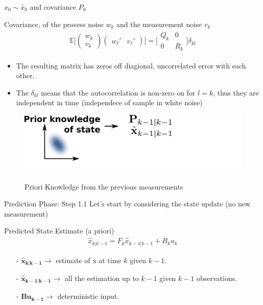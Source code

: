 \documentclass[aspectratio=169,hyperref={pdfpagelabels=false}]{beamer}
\begin{document}
\begin{frame}{}
  $x_0 \sim \tilde{x_0}$ and covariance $P_0$
  \begin{block}{Covariance, of the process noise $w_k$ and the measurement noise $v_k$}
    \begin{align*}
      \mathbb{E}\Biggl [
        \begin{pmatrix}
        w_k \\
        v_k
        \end{pmatrix}
        \begin{pmatrix}
          w_{\ell}' & v_{\ell}'
          \end{pmatrix}
        \Biggr ] = \Biggl [ \begin{matrix}
          Q_k & 0\\
          0 & R_k 
          \end{matrix} \Biggr ] \delta_{kl}
    \end{align*}
  \end{block}
\begin{itemize}
  \item The resulting matrix has zeros off diagional, uncorrelated error with each other.
  \item The $\delta_{kl}$ means that the autocorrelation is non-zero on for $l=k$, thus they are independent in time (independece of sample in white noise)
\end{itemize}
\end{frame}

\begin{frame}
  \begin{figure}
    \centering
    \includegraphics[width=0.9\linewidth]{img/3.pdf}
    \caption{\\ Priori Knowledge from the previous measurements}
  \end{figure}
\end{frame}

\begin{frame}{Prediction Phase: Step 1.1}
  Let's start by considering the state update (no new measurement)
  \begin{block}{Predicted State Estimate (a priori)}
  \begin{align*}
    \boxed{\hat{x}_{k|k-1} = F_{k} \hat{x}_{k-1|k-1} + B_{k}u_{k}}
  \end{align*}
  \begin{itemize}
    \item[-] $\mathbf{\hat{x}_{k|k-1}} \rightarrow$ estimate of x at time $k$ given $k-1$.
    \item[-] $\mathbf{\hat{x}_{k-1|k-1}} \rightarrow$ all the estimation up to $k-1$ given $k-1$ observations.
    \item[-] $\mathbf{Bu_{k-1}} \rightarrow$ deterministic input.
  \end{itemize}
  \end{block}
\end{frame}
\end{document}
